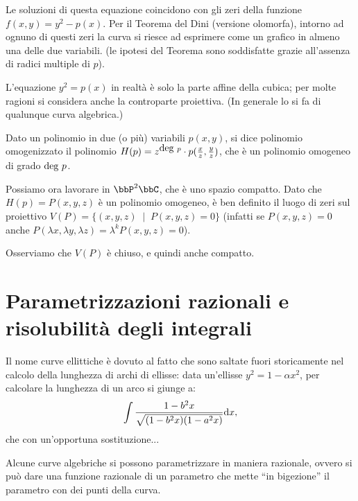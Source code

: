 Le soluzioni di questa equazione coincidono con gli zeri della funzione $f(x,y) = y^2 - p(x)$.  Per il Teorema del Dini (versione olomorfa), intorno ad ognuno di questi zeri la curva si riesce ad esprimere come un grafico in almeno una delle due variabili.  (le ipotesi del Teorema sono soddisfatte grazie all'assenza di radici multiple di $p$).


L'equazione $y^2=p(x)$ in realtà è solo la parte affine della cubica; per molte ragioni si considera anche la controparte proiettiva. (In generale lo si fa di qualunque curva algebrica.)

\begin{definizione}
  Dato un polinomio in due (o più) variabili $p(x,y)$, si dice polinomio omogenizzato il polinomio $H(p)=z^{\mbox{deg } p} \cdot p(\frac{x}{z}, \frac{y}{z})$, che è un polinomio omogeneo di grado $\mbox{deg } p$.
\end{definizione}

Possiamo ora lavorare in $\bbP^2 \bbC$, che è uno spazio compatto. Dato che $H(p)=P(x,y,z)$ è un polinomio omogeneo, è ben definito il luogo di zeri sul proiettivo $V(P)=\{ (x,y,z) \;\mid\; P(x,y,z) = 0 \}$ (infatti se $P(x,y,z)=0$ anche $P(\lambda x,\lambda y,\lambda z)=\lambda^kP(x,y,z)=0$).

Osserviamo che $V(P)$ è chiuso, e quindi anche compatto.


\section{Parametrizzazioni razionali e risolubilità degli integrali}
Il nome curve ellittiche è dovuto al fatto che sono saltate fuori storicamente nel calcolo della lunghezza di archi di ellisse: data un'ellisse $y^2 = 1 - \alpha x^2$, per calcolare la lunghezza di un arco si giunge a:
\[
	\int \frac{1-b^2 x}{\sqrt{(1-b^2 x) (1-a^2 x)}} \text{d} x,
\]
che con un'opportuna sostituzione...

Alcune curve algebriche si possono parametrizzare in maniera razionale, ovvero si può dare una funzione razionale di un parametro che mette ``in bigezione'' il parametro con dei punti della curva.

